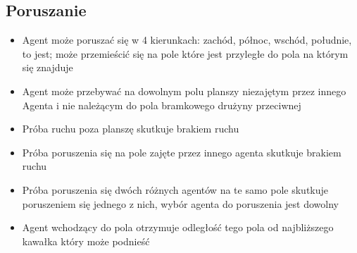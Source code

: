 \documentclass[Dokumentacja.tex]{subfiles}
\begin{document}
\subsection{Poruszanie}
\begin{itemize}
    \item Agent może poruszać się w 4 kierunkach: zachód, północ, wschód, południe, to jest; może przemieścić się na pole które jest przyległe do pola na którym się znajduje
    \item Agent może przebywać na dowolnym polu planszy niezajętym przez innego Agenta i nie należącym do pola bramkowego drużyny przeciwnej
    \item Próba ruchu poza planszę skutkuje brakiem ruchu
    \item Próba poruszenia się na pole zajęte przez innego agenta skutkuje brakiem ruchu
    \item Próba poruszenia się dwóch różnych agentów na te samo pole skutkuje poruszeniem się jednego z nich, wybór agenta do poruszenia jest dowolny
    \item Agent wchodzący do pola otrzymuje odległość tego pola od najbliższego kawałka który może podnieść
\end{itemize}
\end{document}
